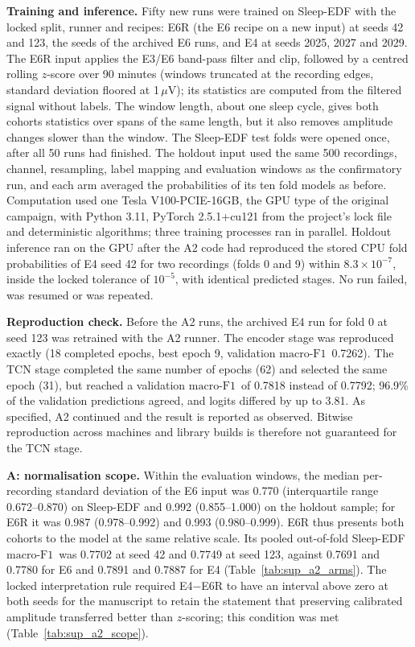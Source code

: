 \documentclass[10pt,a4paper]{article}
\newcommand{\mf}{\ensuremath{\mathrm{macro\text{-}F1}}}
\begin{document}
\textbf{Training and inference.} Fifty new runs were trained on Sleep-EDF with the locked split, runner
and recipes: E6R (the E6 recipe on a new input) at seeds 42 and 123, the seeds of the archived E6 runs,
and E4 at seeds 2025, 2027 and 2029. The E6R input applies the E3/E6 band-pass filter and clip, followed
by a centred rolling $z$-score over 90 minutes (windows truncated at the recording edges, standard
deviation floored at 1\,$\mu$V); its statistics are computed from the filtered signal without labels.
The window length, about one sleep cycle, gives both cohorts statistics over spans of the same length,
but it also removes amplitude changes slower than the window. The Sleep-EDF test folds were opened once,
after all 50 runs had finished. The holdout input used the same 500 recordings, channel, resampling,
label mapping and evaluation windows as the confirmatory run, and each arm averaged the probabilities
of its ten fold models as before. Computation used one Tesla V100-PCIE-16GB, the GPU type of the
original campaign, with Python 3.11, PyTorch 2.5.1+cu121 from the project's lock file and
deterministic algorithms; three training processes ran in parallel. Holdout inference ran on the GPU
after the A2 code had reproduced the stored CPU fold probabilities of E4 seed 42 for two recordings
(folds 0 and 9) within $8.3\times10^{-7}$, inside the locked tolerance of $10^{-5}$, with identical
predicted stages. No run failed, was resumed or was repeated.

\textbf{Reproduction check.} Before the A2 runs, the archived E4 run for fold 0 at seed 123 was
retrained with the A2 runner. The encoder stage was reproduced exactly (18 completed epochs, best
epoch 9, validation \mf\ 0.7262). The TCN stage completed the same number of epochs (62) and selected
the same epoch (31), but reached a validation \mf\ of 0.7818 instead of 0.7792; 96.9\% of the
validation predictions agreed, and logits differed by up to 3.81. As specified, A2 continued and the
result is reported as observed. Bitwise reproduction across machines and library builds is therefore
not guaranteed for the TCN stage.

\textbf{A: normalisation scope.} Within the evaluation windows, the median per-recording standard
deviation of the E6 input was 0.770 (interquartile range 0.672--0.870) on Sleep-EDF and 0.992
(0.855--1.000) on the holdout sample; for E6R it was 0.987 (0.978--0.992) and 0.993 (0.980--0.999). E6R
thus presents both cohorts to the model at the same relative scale. Its pooled out-of-fold Sleep-EDF
\mf\ was 0.7702 at seed 42 and 0.7749 at seed 123, against 0.7691 and 0.7780 for E6 and 0.7891 and
0.7887 for E4 (Table~\ref{tab:sup_a2_arms}). The locked interpretation rule required E4$-$E6R to have an
interval above zero at both seeds for the manuscript to retain the statement that preserving
calibrated amplitude transferred better than $z$-scoring; this condition was met
(Table~\ref{tab:sup_a2_scope}).
\end{document}
